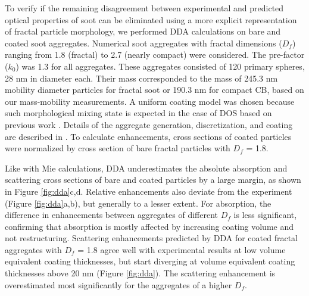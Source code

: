 To verify if the remaining disagreement between experimental and predicted optical properties of soot can be eliminated using a more explicit representation of fractal particle morphology, we performed DDA calculations on bare and coated soot aggregates. Numerical soot aggregates with fractal dimensions ($D_f$) ranging from 1.8 (fractal) to 2.7 (nearly compact) were considered. The pre-factor ($k_0$) was 1.3 for all aggregates. These aggregates consisted of 120 primary spheres, 28 nm in diameter each. Their mass corresponded to the mass of 245.3 nm mobility diameter particles for fractal soot or 190.3 nm for compact CB, based on our mass-mobility measurements. A uniform coating model was chosen because such morphological mixing state is expected in the case of DOS based on previous work \citep{RN70}. Details of the aggregate generation, discretization, and coating are described in \citet{RN22}. To calculate enhancements, cross sections of coated particles were normalized by cross section of bare fractal particles with $D_f$ = 1.8.

Like with Mie calculations, DDA underestimates the absolute absorption and scattering cross sections of bare and coated particles by a large margin, as shown in Figure \ref{fig:dda}c,d. Relative enhancements also deviate from the experiment (Figure \ref{fig:dda}a,b), but generally to a lesser extent. For absorption, the difference in enhancements between aggregates of different $D_f$ is less significant, confirming that absorption is mostly affected by increasing coating volume and not restructuring. Scattering enhancements predicted by DDA for coated fractal aggregates with $D_f$ = 1.8 agree well with experimental results at low volume equivalent coating thicknesses, but start diverging at volume equivalent coating thicknesses above 20 nm (Figure \ref{fig:dda}). The scattering enhancement is overestimated most significantly for the aggregates of a higher $D_f$.


